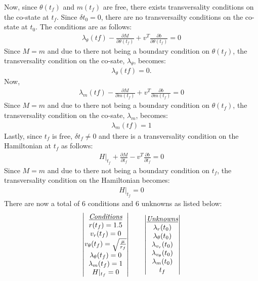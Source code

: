 \documentclass[]{article}
\begin{document}
Now, since \(\theta(t_f)\) and \(m(t_f)\) are free, there exists transversality conditions on the co-state at \(t_f\). Since \(\delta{t_0} = 0\), there are no transversailty conditions on the co-state at \(t_0\). The conditions are as follows:
\begin{align}
	\lambda_\theta(tf) - \frac{\partial M}{\partial \theta(t_f)} + v^{T}\frac{\partial b}{\partial \theta(t_f)} = 0 \nonumber
\end{align}
Since \(M = m\) and due to there not being a boundary condition on \(\theta(t_f)\), the transversality condition on the co-sate, \(\lambda_\theta\), becomes:
\begin{align}
	\lambda_\theta(tf)  = 0. \label{boundarylamtheta}
\end{align}
Now, 
\begin{align}
	\lambda_m(tf) - \frac{\partial M}{\partial m(t_f)} + v^{T}\frac{\partial b}{\partial m(t_f)} = 0 \nonumber
\end{align}
Since \(M = m\) and due to there not being a boundary condition on \(\theta(t_f)\), the transversality condition on the co-sate, \(\lambda_m\), becomes:
\begin{align}
	\lambda_m(tf) = 1 \label{boundarylamm}
\end{align}
Lastly, since \(t_f\) is free, \(\delta{t_f} \neq 0\) and there is a transversality condition on the Hamiltonian at \(t_f\) as follows: 
\begin{align}
	H|_{t_f} + \frac{\partial M}{\partial t_f} - v^{T}\frac{\partial b}{\partial t_f} = 0  \nonumber
\end{align}
Since \(M = m\) and due to there not being a boundary condition on \(t_f\), the transversality condition on the Hamiltonian becomes:
\begin{align}
	H|_{t_f} = 0  \label{boundaryH}
\end{align}
There are now a total of 6 conditions and 6 unknowns as listed below:
 \[
 \begin{vmatrix}
 	\emph{\underline{Conditions}}\\
 	r(t_f)              = 1.5\\
 	v_r(t_f)            = 0\\
 	v_{\theta}(t_f)     =\sqrt{\frac{\mu}{r_f}}\\
 	\lambda_\theta(t_f) = 0\\
 	\lambda_m(t_f)      = 1\\
 	H|_{t_f}            = 0\\
 \end{vmatrix}
\qquad
 \begin{vmatrix}
 	\emph{\underline{Unknowns}}\\
	\lambda_{r}(t_0)\\
	\lambda_{\theta}(t_0)\\
	\lambda_{v_r}(t_0)\\
	\lambda_{v_{\theta}}(t_0)\\
	\lambda_{m}(t_0)\\
	t_f\\
 \end{vmatrix}
 \]
\end{document}
